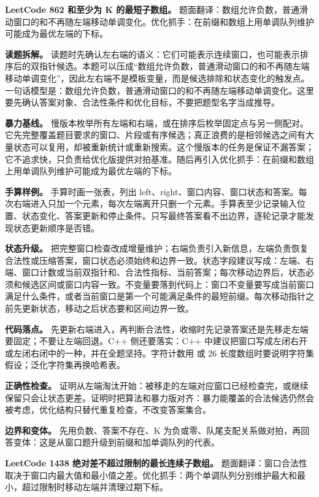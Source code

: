 \noindent\textbf{LeetCode 862 和至少为 K 的最短子数组。} 题面翻译：数组允许负数，普通滑动窗口的和不再随左端移动单调变化。优化抓手：在前缀和数组上用单调队列维护可能成为最优左端的下标。

\textbf{读题拆解。} 读题时先确认左右端的语义：它们可能表示连续窗口，也可能表示排序后的双指针候选。本题可以压成“数组允许负数，普通滑动窗口的和不再随左端移动单调变化”，因此左右端不是模板变量，而是候选排除和状态变化的触发点。一句话模型是：数组允许负数，普通滑动窗口的和不再随左端移动单调变化。这里要先确认答案对象、合法性条件和优化目标，不要把题型名字当成推导。

\textbf{暴力基线。} 慢版本枚举所有左端和右端，或在排序后枚举固定点与另一侧配对。它先完整覆盖题目要求的窗口、片段或有序候选；真正浪费的是相邻候选之间有大量状态可以复用，却被重新统计或重新搜索。这个慢版本的任务是保证不漏答案；它不追求快，只负责给优化版提供对拍基准。随后再引入优化抓手：在前缀和数组上用单调队列维护可能成为最优左端的下标。

\textbf{手算样例。} 手算时画一张表，列出 left、right、窗口内容、窗口状态和答案。每次右端进入只加一个元素，每次左端离开只删一个元素。手算表至少记录输入位置、状态变化、答案更新和停止条件。只写最终答案看不出边界，逐轮记录才能发现状态更新顺序是否错。

\textbf{状态升级。} 把完整窗口检查改成增量维护；右端负责引入新信息，左端负责恢复合法性或压缩答案，窗口状态必须始终和边界一致。状态字段建议写成：左端、右端、窗口计数或当前双指针和、合法性指标、当前答案；每次移动边界后，状态必须和候选区间或窗口内容一致。不变量要落到代码上：窗口不变量要写成当前窗口满足什么条件，或者当前窗口是第一个可能满足条件的最短前缀。每次移动指针之前先更新状态，移动之后状态要和区间边界一致。

\textbf{代码落点。} 先更新右端进入，再判断合法性，收缩时先记录答案还是先移走左端要固定；不要让左端回退。C++ 侧还要落实：C++ 中建议把窗口写成左闭右开或左闭右闭中的一种，并在全题坚持。字符计数用  或 26 长度数组时要说明字符集假设；泛化字符集再换哈希表。

\textbf{正确性检查。} 证明从左端淘汰开始：被移走的左端对应窗口已经检查完，或继续保留只会让状态更差。证明时把算法和暴力版对齐：暴力能覆盖的合法候选仍然会被考虑，优化结构只替代重复检查，不改变答案集合。

\textbf{边界和变体。} 先用负数、答案不存在、K 为负或零、队尾支配关系做对拍，再回答变体：这是从窗口题升级到前缀和加单调队列的代表。

\noindent\textbf{LeetCode 1438 绝对差不超过限制的最长连续子数组。} 题面翻译：窗口合法性取决于窗口内最大值和最小值之差。优化抓手：两个单调队列分别维护最大和最小，超过限制时移动左端并清理过期下标。

